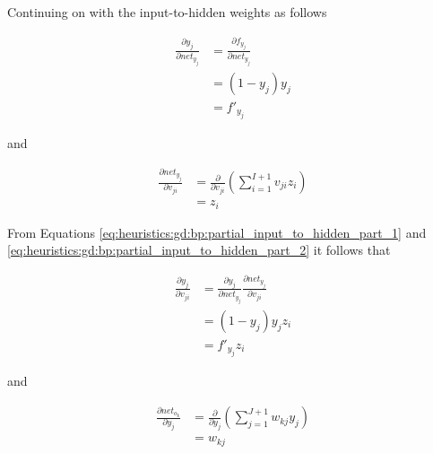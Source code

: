 Continuing on with the input-to-hidden weights as follows

\begin{equation}
      \label{eq:heuristics:gd:bp:partial_input_to_hidden_part_1}
      \begin{split}
            \frac{\partial y_{j}}{\partial net_{y_{j}}}
            &= \frac{\partial f_{y_{j}}}{\partial net_{y_{j}}}\\
            &= (1 - y_{j})y_{j}\\
            &= f'_{y_{j}}
      \end{split}
\end{equation}

and

\begin{equation}
      \label{eq:heuristics:gd:bp:partial_input_to_hidden_part_2}
      \begin{split}
            \frac{\partial net_{y_{j}}}{\partial v_{ji}}
            &= \frac{\partial}{\partial v_{ji}}\left( \sum^{I+1}_{i=1}v_{ji}z_{i}\right)\\
            &= z_{i}
      \end{split}
\end{equation}


From Equations \ref{eq:heuristics:gd:bp:partial_input_to_hidden_part_1} and \ref{eq:heuristics:gd:bp:partial_input_to_hidden_part_2} it follows that

\begin{equation}
      \label{eq:heuristics:gd:bp:partial_input_to_hidden_part_3}
      \begin{split}
            \frac{\partial y_{j}}{\partial v_{ji}}
            &= \frac{\partial y_{j}}{\partial net_{y_{j}}}\frac{\partial net_{y_{j}}}{\partial v_{ji}}\\
            &= (1 - y_{j})y_{j}z_{i}\\
            &= f'_{y_{j}}z_{i}
      \end{split}
\end{equation}

and

\begin{equation}
      \label{eq:heuristics:gd:bp:partial_input_to_hidden_part_4}
      \begin{split}
            \frac{\partial net_{o_{k}}}{\partial y_{j}}
            &= \frac{\partial}{\partial y_{j}}\left( \sum^{J+1}_{j=1}w_{kj}y_{j}\right)\\
            &= w_{kj}
      \end{split}
\end{equation}

